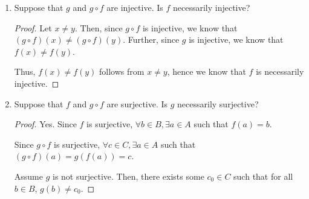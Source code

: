 \documentclass[11pt]{article}
\theoremstyle{definition}
\numberwithin{equation}{subsection}
\begin{document}
\begin{enumerate}
\begin{enumerate}
\begin{proof}
No. For a counterexample, consider $A = \{1\}, B = \{p,q\}, C = \{x\}$. Let $f\colon A \rightarrow B$ be defined by $f(1)=p$ and let $g\colon B \rightarrow C$ be defined by $g(p)=g(q)=x$. Then both $f$ and $g \circ f$ are injective, but $g$ is not injective.

More generally, let $B_0 \subset B$ be the image of $f$. Then, for every $b_0 \in B_0$, i.e., for every element of $B$ that is reached by $f$, there exists a unique $a \in A$ such that $f(a)=b_0$. 

Similarly, let $C_0 \subset C$ be the image of $g\circ f$. Then, for every $c_0 \in C_0$, i.e., for every element of $C$ that is reached by $g \circ f$, there exists a unique $a \in A$ such that $(g\circ f)(a)=c_0$. 

However, there could exist some $b' \in B, b' \notin B_0$ such that $g(b')=c_0$. Then $g(b_0)=g(b')=c_0$ and $b_0 \not = b'$. Hence, $g$ is not necessarily injective.

\renewcommand\qedsymbol{QED}
\end{proof}

\item Suppose that $g$ and $g\circ f$ are injective. Is $f$ necessarily injective?

\begin{proof}
Let $x \not= y$. Then, since $g \circ f$ is injective, we know that $(g \circ f)(x)\not=(g \circ f)(y)$. Further, since $g$ is injective, we know that $f(x)\not=f(y)$.

Thus, $f(x)\not=f(y)$ follows from $x \not= y$, hence we know that $f$ is necessarily injective.


\renewcommand\qedsymbol{QED}
\end{proof}

\item Suppose that $f$ and $g\circ f$ are surjective. Is $g$ necessarily surjective?

\begin{proof}



Yes. Since $f$ is surjective, $\forall b \in B, \exists a \in A$ such that $f(a)=b$.

Since $g \circ f$ is surjective, $\forall c \in C, \exists a \in A$ such that $(g \circ f)(a)=g(f(a))=c$.

Assume $g$ is not surjective. Then, there exists some $c_0 \in C$ such that for all $b \in B$, $g(b) \not = c_0$.


\end{proof}
\end{enumerate}
\end{enumerate}
\end{document}
